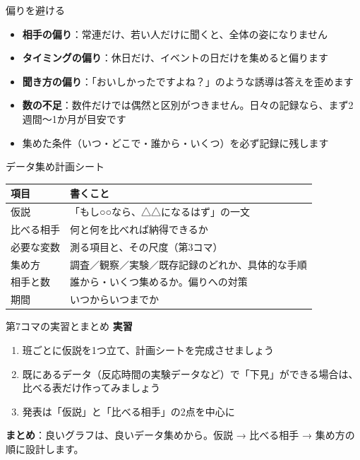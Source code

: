 \documentclass[aspectratio=169,11pt]{beamer}
\begin{document}
\begin{frame}{偏りを避ける}
\begin{itemize}
\item \textbf{相手の偏り}：常連だけ、若い人だけに聞くと、全体の姿になりません
\item \textbf{タイミングの偏り}：休日だけ、イベントの日だけを集めると偏ります
\item \textbf{聞き方の偏り}：「おいしかったですよね？」のような誘導は答えを歪めます
\item \textbf{数の不足}：数件だけでは偶然と区別がつきません。日々の記録なら、まず2週間〜1か月が目安です
\item 集めた条件（いつ・どこで・誰から・いくつ）を必ず記録に残します
\end{itemize}
\end{frame}

\begin{frame}{データ集め計画シート}
\begin{center}
\begin{tabular}{lp{9.4cm}}
\toprule
項目 & 書くこと \\
\midrule
仮説 & 「もし○○なら、△△になるはず」の一文 \\
比べる相手 & 何と何を比べれば納得できるか \\
必要な変数 & 測る項目と、その尺度（第3コマ） \\
集め方 & 調査／観察／実験／既存記録のどれか、具体的な手順 \\
相手と数 & 誰から・いくつ集めるか。偏りへの対策 \\
期間 & いつからいつまでか \\
\bottomrule
\end{tabular}
\end{center}
\end{frame}

\begin{frame}{第7コマの実習とまとめ}
\textbf{実習}
\begin{enumerate}
\item 班ごとに仮説を1つ立て、計画シートを完成させましょう
\item 既にあるデータ（反応時間の実験データなど）で「下見」ができる場合は、比べる表だけ作ってみましょう
\item 発表は「仮説」と「比べる相手」の2点を中心に
\end{enumerate}
\vspace{0.5em}
\textbf{まとめ}：良いグラフは、良いデータ集めから。仮説 → 比べる相手 → 集め方の順に設計します。
\end{frame}
\end{document}
